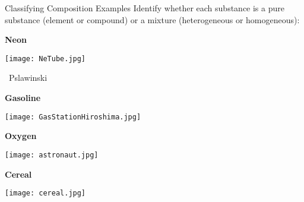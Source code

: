 \documentclass[notes=show]{beamer}
\begin{document}
\begin{frame}[t]{Classifying Composition Examples}
	Identify whether each substance is a \alert{pure substance} (element or
	compound) or a \alert{mixture} (heterogeneous or homogeneous):
	
	\begin{center}
		\begin{minipage}[t]{0.3\linewidth}
			\centering
			\textbf{Neon} 

			\medskip

			\texttt{[image: NeTube.jpg]}

			\medskip
			
			\tiny{\ccbysa\ Pslawinski}
		\end{minipage}
		\qquad
		\begin{minipage}[t]{0.3\linewidth}
			\centering
			\textbf{Gasoline}

			\medskip

			\texttt{[image: GasStationHiroshima.jpg]}
		\end{minipage}

		\bigskip

		\begin{minipage}[t]{0.3\linewidth}
			\centering
			\textbf{Oxygen}

			\medskip

			\texttt{[image: astronaut.jpg]}
		\end{minipage}
		\qquad
		\begin{minipage}[t]{0.3\linewidth}
			\centering
			\textbf{Cereal}

			\medskip

			\texttt{[image: cereal.jpg]}
		\end{minipage}
	\end{center}
	
\end{frame}

%	
\end{document}
